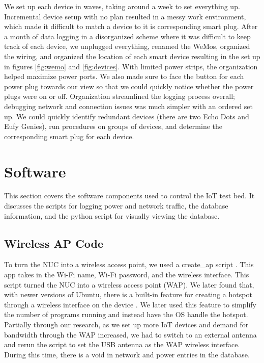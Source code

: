We set up each device in waves, taking around a week to set everything up. Incremental device setup with no plan resulted in a messy work environment, which made it difficult to match a device to it is corresponding smart plug. After a month of data logging in a disorganized scheme where it was difficult to keep track of each device, we unplugged everything, renamed the WeMos, organized the wiring, and organized the location of each smart device resulting in the set up in figures \ref{fig:wemo} and \ref{fig:devices}. With limited power strips, the organization helped maximize power ports. We also made sure to face the button for each power plug towards our view so that we could quickly notice whether the power plugs were on or off. Organization streamlined the logging process overall; debugging network and connection issues was much simpler with an ordered set up. We could quickly identify redundant devices (there are two Echo Dots and Eufy Genies), run procedures on groups of devices, and determine the corresponding smart plug for each device.

\section{Software}
\label{software}
This section covers the software components used to control the IoT test bed. It discusses the scripts for logging power and network traffic, the database information, and the python script for visually viewing the database.

\subsection{Wireless AP Code}
To turn the NUC into a wireless access point, we used a create\_ap script \cite{oblique_2017}. This app takes in the Wi-Fi name, Wi-Fi password, and the wireless interface. This script turned the NUC into a wireless access point (WAP). We later found that, with newer versions of Ubuntu, there is a built-in feature for creating a hotspot through a wireless interface on the device \cite{m_2016}. We later used this feature to simplify the number of programs running and instead have the OS handle the hotspot. Partially through our research, as we set up more IoT devices and demand for bandwidth through the WAP increased, we had to switch to an external antenna and rerun the script to set the USB antenna as the WAP wireless interface. During this time, there is a void in network and power entries in the database.

